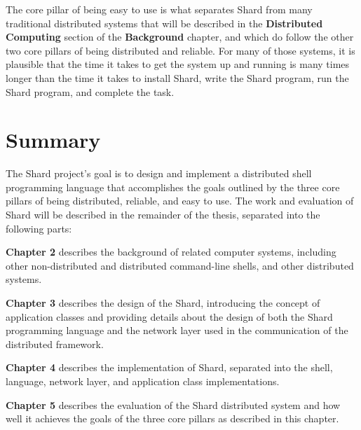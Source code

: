 \documentclass[twoside]{report}
\newcommand{\todoi}[1]{\todo[inline, color=blue!20]{TODO: {#1}}}
\begin{document}
The core pillar of being easy to use is what separates Shard from many traditional distributed systems that will be described in the \textbf{Distributed Computing} section of the \textbf{Background} chapter, and which do follow the other two core pillars of being distributed and reliable. For many of those systems, it is plausible that the time it takes to get the system up and running is many times longer than the time it takes to install Shard, write the Shard program, run the Shard program, and complete the task.

\section{Summary}


The Shard project's goal is to design and implement a distributed shell programming language that accomplishes the goals outlined by the three core pillars of being distributed, reliable, and easy to use.
The work and evaluation of Shard  will be described in the remainder of the thesis, separated into the following parts:

\textbf{Chapter 2} describes the background of related computer systems, including other non-distributed and distributed command-line shells, and other distributed systems.

\textbf{Chapter 3} describes the design of the Shard, introducing the concept of application classes and providing details about the design of both the Shard programming language and the network layer used in the communication of the distributed framework.

\textbf{Chapter 4} describes the implementation of Shard, separated into the shell, language, network layer, and application class implementations.

\textbf{Chapter 5} describes the evaluation of the Shard distributed system and how well it achieves the goals of the three core pillars as described in this chapter.
\end{document}
